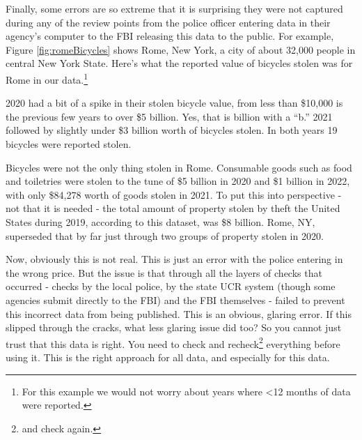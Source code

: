 \documentclass[
]{krantz}
\begin{document}
Finally, some errors are so extreme that it is surprising
they were not captured during any of the review points from
the police officer entering data in their agency's computer
to the FBI releasing this data to the public. For example,
Figure \ref{fig:romeBicycles} shows Rome, New York, a city
of about 32,000 people in central New York State. Here's
what the reported value of bicycles stolen was for Rome in
our data.\footnote{For this example we would not worry about
  years where \textless12 months of data were reported.}

2020 had a bit of a spike in their stolen bicycle value,
from less than \$10,000 is the previous few years to over
\$5 billion. Yes, that is billion with a ``b.'' 2021
followed by slightly under \$3 billion worth of bicycles
stolen. In both years 19 bicycles were reported stolen.

Bicycles were not the only thing stolen in Rome. Consumable
goods such as food and toiletries were stolen to the tune of
\$5 billion in 2020 and \$1 billion in 2022, with only
\$84,278 worth of goods stolen in 2021. To put this into
perspective - not that it is needed - the total amount of
property stolen by theft the United States during 2019,
according to this dataset, was \$8 billion. Rome, NY,
superseded that by far just through two groups of property
stolen in 2020.

Now, obviously this is not real. This is just an error with
the police entering in the wrong price. But the issue is
that through all the layers of checks that occurred - checks
by the local police, by the state UCR system (though some
agencies submit directly to the FBI) and the FBI themselves
- failed to prevent this incorrect data from being
published. This is an obvious, glaring error. If this
slipped through the cracks, what less glaring issue did too?
So you cannot just trust that this data is right. You need
to check and recheck\footnote{and check again.} everything
before using it. This is the right approach for all data,
and especially for this data.
\end{document}
